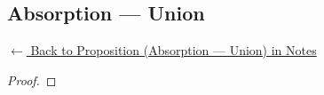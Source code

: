
\subsection*{Absorption --- Union}
\label{prf:absorption-cup}

\begin{remark*}[Return]
\hyperref[prop:absorption-cup]{$\leftarrow$ Back to Proposition (Absorption --- Union) in Notes}
\end{remark*}

\begin{proof}
\end{proof}

\begin{remark*}

\end{remark*}

\begin{remark*}[Dependencies]

\FlashUses{}
\end{remark*}
